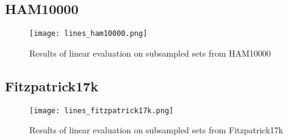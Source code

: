 \subsection{HAM10000}

\begin{figure}[H]
    \begin{center}
    \texttt{[image: lines\_ham10000.png]}
    \caption{Results of linear evaluation on subsampled sets from HAM10000}\label{fig:lines_ham10000}
    \end{center}
\end{figure}

\subsection{Fitzpatrick17k}

\begin{figure}[H]
    \begin{center}
    \texttt{[image: lines\_fitzpatrick17k.png]}
    \caption{Results of linear evaluation on subsampled sets from Fitzpatrick17k}\label{fig:lines_fitzpatrick17k}
    \end{center}
\end{figure}


